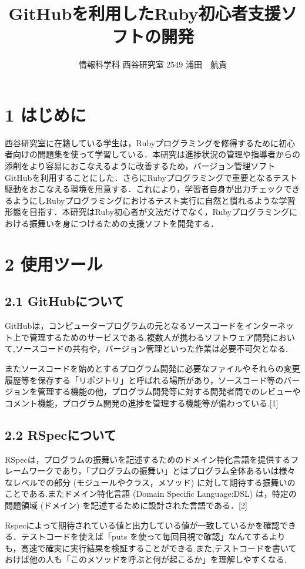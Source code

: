 \documentclass[a4j,twocolumn,uplatex]{jsarticle}
\begin{document}
\title{GitHubを利用したRuby初心者支援ソフトの開発}
\author{情報科学科 西谷研究室 2549 浦田　航貴}
\date{}
\maketitle
\section{1 はじめに}
西谷研究室に在籍している学生は，Rubyプログラミングを修得するために初心者向けの問題集を使って学習している．本研究は進捗状況の管理や指導者からの添削をより容易におこなえるように改善するため，バージョン管理ソフトGitHubを利用することにした．さらにRubyプログラミングで重要となるテスト駆動をおこなえる環境を用意する．これにより，学習者自身が出力チェックできるようにしRubyプログラミングにおけるテスト実行に自然と慣れるような学習形態を目指す．本研究はRuby初心者が文法だけでなく，Rubyプログラミングにおける振舞いを身につけるための支援ソフトを開発する．

\section{2 使用ツール}
\subsection{2.1 GitHubについて}
GitHubは，コンピュータープログラムの元となるソースコードをインターネット上で管理するためのサービスである.複数人が携わるソフトウェア開発において,ソースコードの共有や，バージョン管理といった作業は必要不可欠となる.

またソースコードを始めとするプログラム開発に必要なファイルやそれらの変更履歴等を保存する「リポジトリ」と呼ばれる場所があり，ソースコード等のバージョンを管理する機能の他，プログラム開発等に対する開発者間でのレビューやコメント機能，プログラム開発の進捗を管理する機能等が備わっている.[1]

\subsection{2.2 RSpecについて}
RSpecは，プログラムの振舞いを記述するためのドメイン特化言語を提供するフレームワークであり，「プログラムの振舞い」とはプログラム全体あるいは様々なレベルでの部分 (モジュールやクラス，メソッド) に対して期待する振舞いのことである.またドメイン特化言語 (Domain Specific Language:DSL) は，特定の問題領域 (ドメイン) を記述するために設計された言語である．[2]

Rspecによって期待されている値と出力している値が一致しているかを確認できる．テストコードを使えば「puts を使って毎回目視で確認」なんてするよりも，高速で確実に実行結果を検証することができる.また,テストコードを書いておけば他の人も「このメソッドを呼ぶと何が起こるか」を理解しやすくなる.
\end{document}
